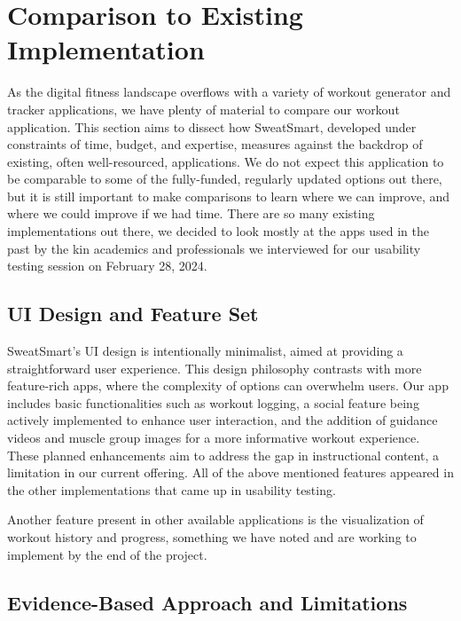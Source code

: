 \documentclass[12pt, titlepage]{article}
\begin{document}
\section{Comparison to Existing Implementation}

As the digital fitness landscape overflows with a variety of workout generator and tracker applications, we have plenty of material to compare our workout application. This section aims to dissect how SweatSmart, developed under constraints of time, budget, and expertise, measures against the backdrop of existing, often well-resourced, applications. We do not expect this application to be comparable to some of the fully-funded, regularly updated options out there, but it is still important to make comparisons to learn where we can improve, and where we could improve if we had time. There are so many existing implementations out there, we decided to look mostly at the apps used in the past by the kin academics and professionals we interviewed for our usability testing session on February 28, 2024. 

\subsection{UI Design and Feature Set}

SweatSmart’s UI design is intentionally minimalist, aimed at providing a straightforward user experience. This design philosophy contrasts with more feature-rich apps, where the complexity of options can overwhelm users. Our app includes basic functionalities such as workout logging, a social feature being actively implemented to enhance user interaction, and the addition of guidance videos and muscle group images for a more informative workout experience. These planned enhancements aim to address the gap in instructional content, a limitation in our current offering. All of the above mentioned features appeared in the other implementations that came up in usability testing.

Another feature present in other available applications is the visualization of workout history and progress, something we have noted and are working to implement by the end of the project.

\subsection{Evidence-Based Approach and Limitations}
\end{document}
